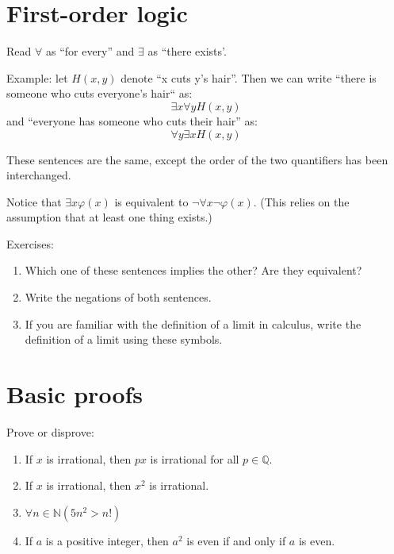 \documentclass[letterpaper,12pt]{article}
\renewcommand{\phi}{\varphi}
\begin{document}
\newpage

\section{First-order logic}
Read $\forall$ as ``for every'' and $\exists$ as ``there exists'.

Example: let $H(x, y)$ denote ``x cuts y's hair''. Then we can write ``there is someone who cuts everyone's hair`` as:
$$\exists x \forall y H(x, y)$$
and ``everyone has someone who cuts their hair'' as:
$$\forall y \exists x H(x, y)$$

These sentences are the same, except the order of the two quantifiers has been interchanged.

Notice that $\exists x \phi(x)$ is equivalent to $\neg \forall x \neg \phi(x)$. (This relies on the assumption that at least one thing exists.)

Exercises:
\begin{enumerate}
\item
Which one of these sentences implies the other? Are they equivalent?
\item
Write the negations of both sentences.
\item
If you are familiar with the definition of a limit in calculus, write the definition of a limit using these symbols.
\end{enumerate}

\section{Basic proofs}
Prove or disprove:

\begin{enumerate}
\item
If $x$ is irrational, then $px$ is irrational for all $p \in \mathbb{Q}$.
\item
If $x$ is irrational, then $x^2$ is irrational.
\item
$\forall n \in \mathbb{N} (5n^2 > n!)$
\item
If $a$ is a positive integer, then $a^2$ is even if and only if $a$ is even.
\end{enumerate}
\end{document}
